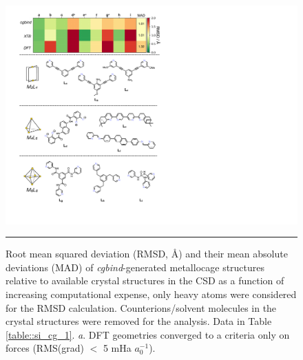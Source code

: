 \documentclass[../../main.tex]{subfiles}
\begin{document}
\begin{figure}[h!]
	\vspace{0.4cm}
	\centering
	\includegraphics[width=13.2cm]{3/cgbind/figs/fig6/fig6}
	\vspace{0.2cm}
	\hrule
	\caption{Root mean squared deviation (RMSD, \AA) and their mean absolute deviations (MAD) of \emph{cgbind}-generated metallocage structures relative to available crystal structures in the CSD as a function of increasing computational expense, only heavy atoms were considered for the RMSD calculation. Counterions/solvent molecules in the crystal structures were removed for the analysis. Data in Table \ref{table::si_cg_1}. \emph{a}. DFT geometries converged to a criteria only on forces (RMS(grad) $<$ 5 mHa $a_0^{-1}$).}
	\label{fig::cg_6}
\end{figure}

\clearpage
\end{document}
